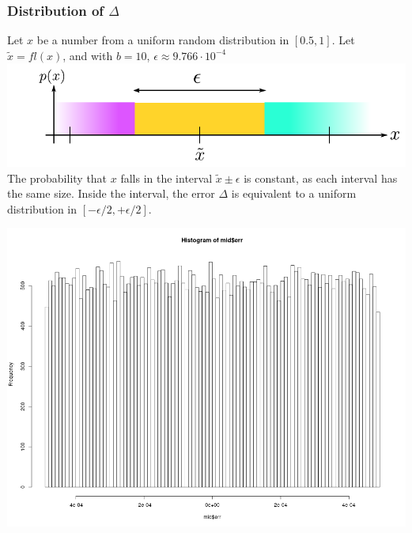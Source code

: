 \documentclass[serif, 12pt]{beamer}
\begin{document}

\begin{frame}

\frametitle{Distribution of $\Delta$}

Let $x$ be a number from a uniform random distribution in $[0.5,1]$. Let 
$\tilde{x} = fl(x)$, and with $b=10$, $\epsilon \approx 9.766 \cdot 10^{-4}$
%
%
\\\vspace{1em}
%
\includegraphics[width=.9\textwidth]{img/px.pdf}
%
\\\vspace{1em}
%
The probability that $x$ falls in the interval $\tilde x \pm \epsilon$ is 
constant, as each interval has the same size. Inside the interval, the error 
$\Delta$ is equivalent to a uniform distribution in $[-\epsilon/2, 
+\epsilon/2]$.

\end{frame}


\begin{frame}
	\centering
	\includegraphics[width=\textwidth]{img/half-prob.png}
\end{frame}
\end{document}
